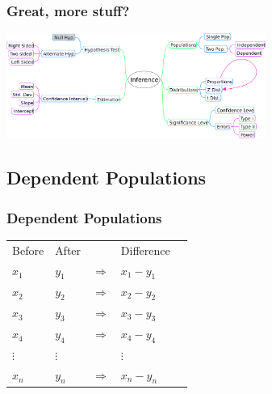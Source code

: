 \begin{frame}
  \frametitle{Great, more stuff?}
  \includegraphics[width=8.5cm]{img/inference}
\end{frame}


\subsection{Dependent Populations}

\begin{frame}
  \frametitle{Dependent Populations}

  \begin{tabular}{l<{\onslide<2->}l<{\onslide<3->}ll<{\onslide}l}
    Before & After & & Difference \\
    $x_1$ & $y_1$ & $\Rightarrow$ & $x_1-y_1$ \\
    $x_2$ & $y_2$ & $\Rightarrow$ & $x_2-y_2$ \\
    $x_3$ & $y_3$ & $\Rightarrow$ & $x_3-y_3$ \\
    $x_4$ & $y_4$ & $\Rightarrow$ & $x_4-y_4$ \\
    $\vdots$ & $\vdots$ & & $\vdots$ \\
    $x_n$ & $y_n$ & $\Rightarrow$ & $x_n-y_n$ \\
  \end{tabular}

\end{frame}


